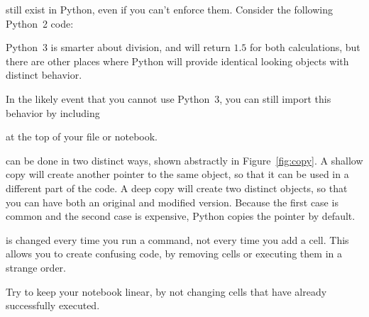 \documentclass[justified, nobib]{tufte-handout}
\begin{document}
\vspace{5mm}
 still exist in Python, even if you can't enforce them.
Consider the following Python~2 code:

Python~3 is smarter about division, and will return $1.5$ for both calculations, but there are other places where Python will provide identical looking objects with distinct behavior.


\noindent
In the likely event that you cannot use Python~3, you can still import this behavior by including

\hspace{25pt}

\noindent
at the top of your file or notebook.

 can be done in two distinct ways, shown abstractly in Figure~\ref{fig:copy}.
A shallow copy will create another pointer to the same object, so that it can be used in a different part of the code.
A deep copy will create two distinct objects, so that you can have both an original and modified version.
Because the first case is common and the second case is expensive, Python copies the pointer by default.



\begin{marginfigure}[-10\baselineskip]%
    \vspace*{\fill}
    \centering

    \def\svgwidth{75pt}

    \vspace*{\fill}
    \bigskip
    \def\svgwidth{140pt}
  \caption{%
The finger pointing at the moon is not the moon}
\label{fig:copy}
\end{marginfigure}

\pagebreak

 is changed every time you run a command, not
every time you add a cell.
This allows you to create confusing code, by removing cells or executing them in a strange order.



\noindent
Try to keep your notebook linear, by not changing cells that have already successfully executed.
\end{document}
